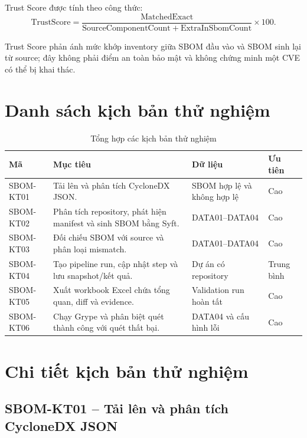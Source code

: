 \documentclass[12pt,a4paper]{article}
\begin{document}
Trust Score được tính theo công thức:
\[
  \mathrm{TrustScore}=
  \frac{\mathrm{MatchedExact}}
       {\mathrm{SourceComponentCount}+\mathrm{ExtraInSbomCount}}
  \times 100.
\]

Trust Score phản ánh mức khớp inventory giữa SBOM đầu vào và SBOM sinh lại từ source;
đây không phải điểm an toàn bảo mật và không chứng minh một CVE có thể bị khai thác.

\section{Danh sách kịch bản thử nghiệm}

\begin{table}[H]
  \centering
  \caption{Tổng hợp các kịch bản thử nghiệm}
  \begin{tabularx}{\textwidth}{|C{2.1cm}|Y|L{3.2cm}|C{1.8cm}|}
    \hline
    \textbf{Mã} & \textbf{Mục tiêu} & \textbf{Dữ liệu} & \textbf{Ưu tiên} \\ \hline
    SBOM-KT01 & Tải lên và phân tích CycloneDX JSON. & SBOM hợp lệ và không hợp lệ & Cao \\ \hline
    SBOM-KT02 & Phân tích repository, phát hiện manifest và sinh SBOM bằng Syft. & DATA01--DATA04 & Cao \\ \hline
    SBOM-KT03 & Đối chiếu SBOM với source và phân loại mismatch. & DATA01--DATA04 & Cao \\ \hline
    SBOM-KT04 & Tạo pipeline run, cập nhật step và lưu snapshot/kết quả. & Dự án có repository & Trung bình \\ \hline
    SBOM-KT05 & Xuất workbook Excel chứa tổng quan, diff và evidence. & Validation run hoàn tất & Cao \\ \hline
    SBOM-KT06 & Chạy Grype và phân biệt quét thành công với quét thất bại. & DATA04 và cấu hình lỗi & Cao \\ \hline
  \end{tabularx}
\end{table}

\section{Chi tiết kịch bản thử nghiệm}

\subsection{SBOM-KT01 -- Tải lên và phân tích CycloneDX JSON}
\end{document}
